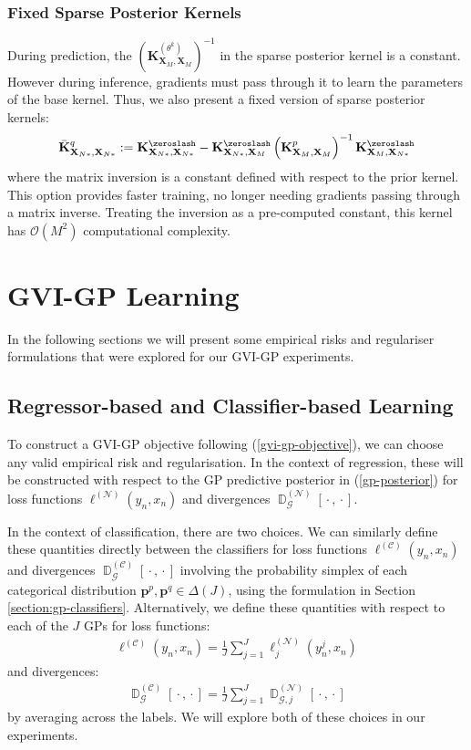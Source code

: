 \documentclass{article}
\newcommand{\D}{\operatorname{\mathbb{D}}}
\newcommand{\wc}{\operatorname{{}\cdot{}}}
\numberwithin{equation}{section}
\begin{document}
\subsubsection{Fixed Sparse Posterior Kernels}
During prediction, the $\left( \mathbf{K}^{(\theta^k)}_{\mathbf{X}_M, \mathbf{X}_M} \right)^{-1}$ in the sparse posterior kernel is a constant. However during inference, gradients must pass through it to learn the parameters of the base kernel. Thus, we also present a fixed version of sparse posterior kernels:
\begin{align}
            \bar{\mathbf{K}}^q_{\mathbf{X}_{N*}, \mathbf{X}_{N*}} := \mathbf{K}^{\zeroslash}_{\mathbf{X}_{N*}, \mathbf{X}_{N*}} - \mathbf{K}^{\zeroslash}_{\mathbf{X}_{N*}, \mathbf{X}_M} \left( \mathbf{K}^{p}_{\mathbf{X}_M, \mathbf{X}_M} \right)^{-1} \mathbf{K}^{\zeroslash}_{\mathbf{X}_M, \mathbf{X}_{N*}}
\end{align}
where the matrix inversion is a constant defined with respect to the prior kernel. This option provides faster training, no longer needing gradients passing through a matrix inverse. Treating the inversion as a pre-computed constant, this kernel has $\mathcal{O}(M^2)$ computational complexity.

\newpage
\section{GVI-GP Learning}\label{section:gvi-gp-learning}
In the following sections we will present some empirical risks and regulariser formulations that were explored for our GVI-GP experiments.

\subsection{Regressor-based and Classifier-based Learning}
To construct a GVI-GP objective following (\ref{gvi-gp-objective}), we can choose any valid empirical risk and regularisation. In the context of regression, these will be constructed with respect to the GP predictive posterior in (\ref{gp-posterior}) for loss functions $\ell^{(\mathcal{N})}(y_n, x_n)$ and divergences $\D_{\mathcal{G}}^{(\mathcal{N})}[\wc, \wc]$.

In the context of classification, there are two choices. We can similarly define these quantities directly between the classifiers for loss functions $\ell^{(\mathcal{C})}(y_n, x_n)$ and divergences $\D^{(\mathcal{C})}_{\mathcal{G}}[\wc, \wc]$ involving the probability simplex of each categorical distribution $\mathbf{p}^p, \mathbf{p}^q \in \Delta(J)$, using the formulation in Section \ref{section:gp-classifiers}. Alternatively, we define these quantities with respect to each of the $J$ GPs for loss functions:
\begin{align}
    \ell^{(\mathcal{C})}(y_n, x_n) = \frac{1}{J}\sum_{j=1}^{J}\ell_j^{(\mathcal{N})}(y^j_n, x_n)
\end{align}
and divergences:
\begin{align}
    \D^{(\mathcal{C})}_{\mathcal{G}}[\wc, \wc] = \frac{1}{J}\sum_{j=1}^{J}\D_{\mathcal{G}, j}^{(\mathcal{N})}[\wc, \wc]
\end{align}
by averaging across the labels. We will explore both of these choices in our experiments. 
\end{document}
